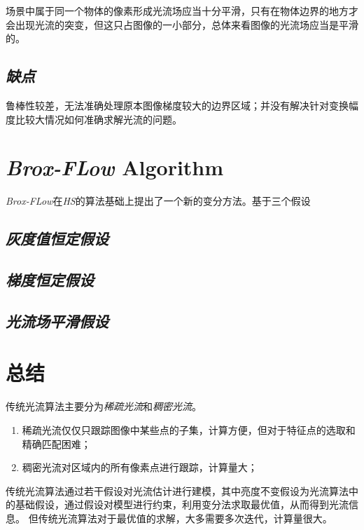 场景中属于同一个物体的像素形成光流场应当十分平滑，只有在物体边界的地方才会出现光流的突变，但这只占图像的一小部分，总体来看图像的光流场应当是平滑的。

\subsection*{\textsl{缺点}}

鲁棒性较差，无法准确处理原本图像梯度较大的边界区域；并没有解决针对变换幅度比较大情况如何准确求解光流的问题。

\section{\textsl{Brox-FLow} Algorithm}

\textsl{Brox-FLow}在\textsl{HS}的算法基础上提出了一个新的变分方法。基于三个假设

\subsection*{\textsl{灰度值恒定假设}}

\subsection*{\textsl{梯度恒定假设}}

\subsection*{\textsl{光流场平滑假设}}

\section{总结}

传统光流算法主要分为\textsl{稀疏光流}和\textsl{稠密光流}。
\begin{enumerate}
    \item 稀疏光流仅仅只跟踪图像中某些点的子集，计算方便，但对于特征点的选取和精确匹配困难；
    \item 稠密光流对区域内的所有像素点进行跟踪，计算量大；
\end{enumerate}

传统光流算法通过若干假设对光流估计进行建模，其中亮度不变假设为光流算法中的基础假设，通过假设对模型进行约束，利用变分法求取最优值，从而得到光流信息。
但传统光流算法对于最优值的求解，大多需要多次迭代，计算量很大。
